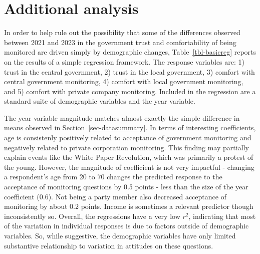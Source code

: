 \documentclass[
  letterpaper,
  DIV=11,
  numbers=noendperiod]{scrartcl}
\begin{document}
\hypertarget{sec-analysis}{%
\section{Additional analysis}\label{sec-analysis}}

In order to help rule out the possibility that some of the differences
observed between 2021 and 2023 in the government trust and
comfortability of being monitored are driven simply by demographic
changes, Table~\ref{tbl-basicreg} reports on the results of a simple
regression framework. The response variables are: 1) trust in the
central government, 2) trust in the local government, 3) comfort with
central government monitoring, 4) comfort with local government
monitoring, and 5) comfort with private company monitoring. Included in
the regression are a standard suite of demographic variables and the
year variable.

The year variable magnitude matches almost exactly the simple difference
in means observed in Section~\ref{sec-datasummary}. In terms of
interesting coefficients, age is consistenly positively related to
acceptance of government monitoring and negatively related to private
corporation monitoring. This finding may partially explain events like
the White Paper Revolution, which was primarily a protest of the young.
However, the magnitude of coefficient is not very impactful - changing a
respondent's age from 20 to 70 changes the predicted response to the
acceptance of monitoring questions by 0.5 points - less than the size of
the year coefficient (0.6). Not being a party member also decreased
acceptance of monitoring by about 0.2 points. Income is sometimes a
relevant predictor though inconsistently so. Overall, the regressions
have a very low \(r^2\), indicating that most of the variation in
individual responses is due to factors outside of demographic variables.
So, while suggestive, the demographic variables have only limited
substantive relationship to variation in attitudes on these questions.
\end{document}
